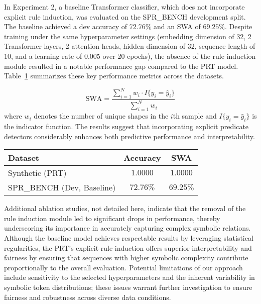 \documentclass{article}
\begin{document}
In Experiment 2, a baseline Transformer classifier, which does not incorporate explicit rule induction, was evaluated on the SPR\_BENCH development split. The baseline achieved a dev accuracy of $72.76\%$ and an SWA of $69.25\%$. Despite training under the same hyperparameter settings (embedding dimension of 32, 2 Transformer layers, 2 attention heads, hidden dimension of 32, sequence length of 10, and a learning rate of $0.005$ over 20 epochs), the absence of the rule induction module resulted in a notable performance gap compared to the PRT model. Table~\ref{tab:results} summarizes these key performance metrics across the datasets.

\[
\text{SWA} = \frac{\sum_{i=1}^{N} w_i \cdot I\{y_i = \hat{y}_i\}}{\sum_{i=1}^{N} w_i}
\]
where \(w_i\) denotes the number of unique shapes in the \(i\)th sample and \(I\{y_i = \hat{y}_i\}\) is the indicator function. The results suggest that incorporating explicit predicate detectors considerably enhances both predictive performance and interpretability.

\begin{table}[h]
\centering
\begin{tabular}{|l|c|c|}
\hline
\textbf{Dataset} & \textbf{Accuracy} & \textbf{SWA} \\
\hline
Synthetic (PRT) & $1.0000$ & $1.0000$ \\
SPR\_BENCH (Dev, Baseline) & $72.76\%$ & $69.25\%$ \\
\hline
\end{tabular}
\label{tab:results}
\end{table}

Additional ablation studies, not detailed here, indicate that the removal of the rule induction module led to significant drops in performance, thereby underscoring its importance in accurately capturing complex symbolic relations. Although the baseline model achieves respectable results by leveraging statistical regularities, the PRT's explicit rule induction offers superior interpretability and fairness by ensuring that sequences with higher symbolic complexity contribute proportionally to the overall evaluation. Potential limitations of our approach include sensitivity to the selected hyperparameters and the inherent variability in symbolic token distributions; these issues warrant further investigation to ensure fairness and robustness across diverse data conditions.
\end{document}
